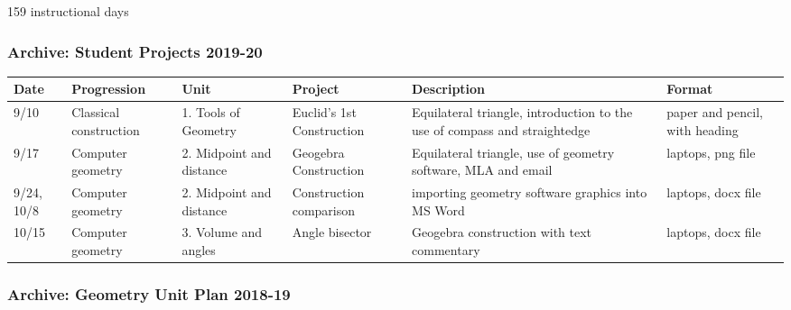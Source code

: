 \documentclass[12pt, twoside]{article}
\begin{document}
159 instructional days

\newpage
\subsubsection*{Archive: Student Projects 2019-20}

\begin{tabular}{|p{1cm}|p{2.5cm}|p{3cm}|p{4cm}|p{8cm}|p{4cm}|}
  \hline
  Date & Progression & Unit & Project & Description & Format \\
  \hline
  9/10 & Classical construction & 1. Tools of Geometry & Euclid's 1st Construction & Equilateral triangle, introduction to the use of compass and straightedge & paper and pencil, with heading \\
  \hline
  9/17 & Computer geometry & 2. Midpoint and distance & Geogebra Construction & Equilateral triangle, use of geometry software, MLA and email & laptops, png file \\
  \hline
  9/24, 10/8 & Computer geometry & 2. Midpoint and distance & Construction comparison & importing geometry software graphics into MS Word & laptops, docx file \\
  \hline
  10/15 & Computer geometry & 3. Volume and angles & Angle bisector & Geogebra construction with text commentary & laptops, docx file \\
  \hline
\end{tabular}

\newpage
\subsubsection*{Archive: Geometry Unit Plan 2018-19}
\end{document}

